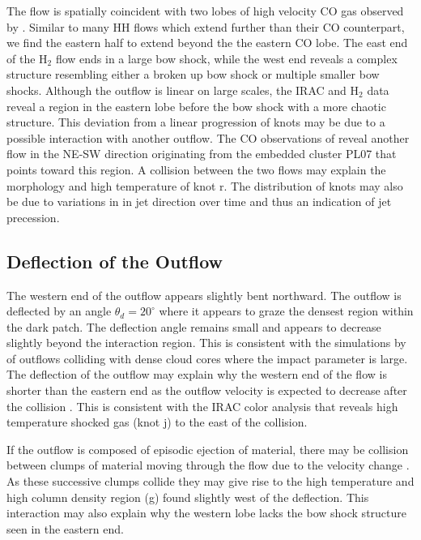 \documentclass[iop]{emulateapj}
\begin{document}
The flow is spatially coincident with two lobes of high velocity CO gas
observed by \citet{den2009}.  Similar to many HH flows which extend 
further than their CO
counterpart, we find the eastern half to extend beyond the the
eastern CO lobe. 
The east end of the H$_2$ flow ends in a large bow
shock, while the west end reveals a complex structure resembling
either a broken up bow shock or multiple smaller bow shocks. 
Although the outflow is linear on large scales, the IRAC and
H$_2$ data reveal a region in the eastern lobe before the bow shock
with a more chaotic structure.
This deviation from a linear progression of knots may be due to
a possible interaction with another outflow. The CO observations 
of \citet{den2009} reveal another flow in the NE-SW direction originating
from the embedded cluster PL07 \citep{phe1997} that points toward this region. 
A collision between the two flows may explain the morphology and 
high temperature of knot r.
The distribution of knots may also be due to variations in in jet direction 
over time and thus an indication of jet precession. 

\subsection{Deflection of the Outflow}

The western end of the outflow appears slightly bent northward. 
The outflow is deflected by an angle $\theta_{d} = 20^{\circ}$
where it appears to graze the densest region within the dark
patch. The
deflection angle remains small and appears to decrease slightly beyond
the interaction region. This is consistent with the simulations by
\citet{bae2009} of outflows colliding with dense cloud cores where
the impact parameter is large. The deflection of the outflow may
explain why the western end of the flow is shorter than the eastern
end as the outflow velocity is expected to decrease after the collision
\citep{rag1995}. This is consistent with the IRAC color analysis that
reveals high temperature shocked gas (knot j)  to the east of the collision.

If the outflow is composed of episodic ejection of material, there may
be collision between clumps of material moving through the flow due 
to the velocity change \citep{rag2003}. As these successive clumps collide they 
may give rise to the high temperature and high column density region (g) 
found slightly west of the deflection.
This interaction may also explain why the western lobe lacks the bow shock 
structure seen in the eastern end.    
\end{document}
